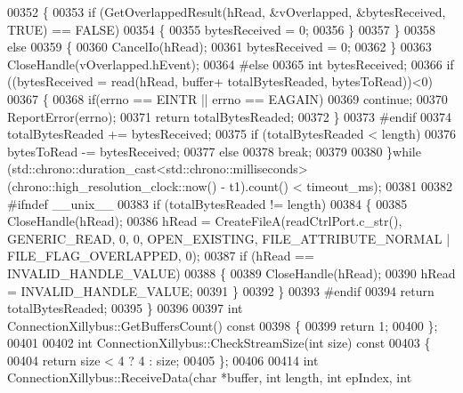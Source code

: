 \begin{DoxyCode}
00352         \{
00353             \textcolor{keywordflow}{if} (GetOverlappedResult(hRead, &vOverlapped, &bytesReceived, TRUE) == FALSE)
00354             \{
00355                 bytesReceived = 0;
00356             \}
00357         \}
00358         \textcolor{keywordflow}{else}
00359         \{
00360             CancelIo(hRead);
00361             bytesReceived = 0;
00362         \}
00363         CloseHandle(vOverlapped.hEvent);
00364 \textcolor{preprocessor}{#else}
00365         \textcolor{keywordtype}{int} bytesReceived;
00366         \textcolor{keywordflow}{if} ((bytesReceived = read(hRead, buffer+ totalBytesReaded, bytesToRead))<0)
00367         \{
00368            \textcolor{keywordflow}{if}(errno == EINTR || errno == EAGAIN)
00369                \textcolor{keywordflow}{continue};
00370            ReportError(errno);
00371            \textcolor{keywordflow}{return} totalBytesReaded;
00372         \}
00373 \textcolor{preprocessor}{#endif}
00374         totalBytesReaded += bytesReceived;
00375         \textcolor{keywordflow}{if} (totalBytesReaded < length)
00376            bytesToRead -= bytesReceived;
00377         \textcolor{keywordflow}{else}
00378            \textcolor{keywordflow}{break};
00379 
00380     \}\textcolor{keywordflow}{while} (std::chrono::duration\_cast<std::chrono::milliseconds>(chrono::high\_resolution\_clock::now() - 
      t1).count() < timeout\_ms);
00381 
00382 \textcolor{preprocessor}{#ifndef \_\_unix\_\_}
00383     \textcolor{keywordflow}{if} (totalBytesReaded != length)
00384     \{
00385         CloseHandle(hRead);
00386         hRead = CreateFileA(readCtrlPort.c\_str(), GENERIC\_READ, 0, 0, OPEN\_EXISTING, FILE\_ATTRIBUTE\_NORMAL 
      | FILE\_FLAG\_OVERLAPPED, 0);
00387         \textcolor{keywordflow}{if} (hRead == INVALID\_HANDLE\_VALUE)
00388         \{
00389             CloseHandle(hRead);
00390             hRead = INVALID\_HANDLE\_VALUE;
00391         \}
00392     \}
00393 \textcolor{preprocessor}{#endif}
00394     \textcolor{keywordflow}{return} totalBytesReaded;
00395 \}
00396 
00397 \textcolor{keywordtype}{int} ConnectionXillybus::GetBuffersCount()\textcolor{keyword}{ const }
00398 \textcolor{keyword}{}\{
00399     \textcolor{keywordflow}{return} 1;
00400 \};
00401 
00402 \textcolor{keywordtype}{int} ConnectionXillybus::CheckStreamSize(\textcolor{keywordtype}{int} size)\textcolor{keyword}{ const }
00403 \textcolor{keyword}{}\{
00404     \textcolor{keywordflow}{return} size < 4 ? 4 : size;
00405 \};
00406 
00414 \textcolor{keywordtype}{int} ConnectionXillybus::ReceiveData(\textcolor{keywordtype}{char} *buffer, \textcolor{keywordtype}{int} length, \textcolor{keywordtype}{int} epIndex, \textcolor{keywordtype}{int} 

\end{DoxyCode}
